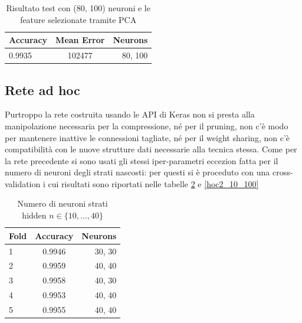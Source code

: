 \documentclass[12pt]{report}
\begin{document}
\begin{table}[H]
\begin{center}
\begin{tabular}{lcr}
\toprule
Accuracy & Mean Error & Neurons \\
\midrule
0.9935 & 102477 & 80, 100\\
\bottomrule
\end{tabular}
\end{center}
\caption{Risultato test con (80, 100) neuroni e le feature selezionate tramite PCA}
\label{keras_pca_test_2h}
\end{table}

\par\null\par
\par\null\par

\subsection{Rete ad hoc}\label{reteAdHoc}
Purtroppo la rete costruita usando le API di Keras non si presta alla manipolazione necessaria per la compressione, né per il pruning, non c’è modo per mantenere inattive le connessioni tagliate, né per il weight sharing, non c’è compatibilità con le nuove strutture dati necessarie alla tecnica stessa.
Come per la rete precedente si sono usati gli stessi iper-parametri eccezion fatta per il numero di neuroni degli strati nascosti: per questi si è proceduto con una cross-validation i cui risultati sono riportati nelle tabelle \ref{hoc2_10_40} e \ref{hoc2_10_100}
\par\null\par
\begin{table}[H]
\begin{center}
\begin{tabular}{lcr}
\toprule
Fold & Accuracy & Neurons \\
\midrule
1 & 0.9946 & 30, 30\\
2 & 0.9959 & 40, 40\\
3 & 0.9958 & 40, 30\\
4 & 0.9953 & 40, 40\\
5 & 0.9955 & 40, 40\\
\bottomrule
\end{tabular}
\end{center}
\caption{Numero di neuroni strati hidden $n \in \{10, \dots, 40 \}$}
\label{hoc2_10_40}
\end{table}
\end{document}
